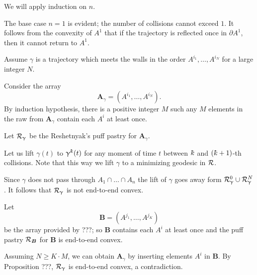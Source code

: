 We will apply induction on $n$.

The base case $n=1$ is evident; the number of collisions cannot exceed $1$.  
It follows from the convexity of $A^1$ that
if the trajectory is reflected once in $\partial A^1$, 
then it cannot return to $A^1$. 

Assume $\gamma$ is a trajectory which meets the walls in the order $A^{i_1},\dots,A^{i_N}$ for a large integer $N$.

Consider the array 
\[\bm{A}_\gamma=(A^{i_1},\dots,A^{i_N}).\]
By induction hypothesis, there is a positive integer $M$ such any $M$ elements in the raw from  $\bm{A}_\gamma$ contain each $A^i$ at least once.

Let $\mathcal{R}_\upgamma$ be  the  Reshetnyak's puff pastry for  $\bm{A}_\gamma$.

Let us lift $\gamma(t)$ to $\gamma^\kay(t)$ 
for any moment of time $t$ between $\kay$ and $(\kay+1)$-th collisions.
Note that this way we lift $\gamma$ to a minimizing geodesic in $\mathcal{R}$.

Since $\gamma$ does not pass through $A_1\cap\dots\cap A_n$
the lift of $\gamma$ goes away form $\spc{R}_\gamma^0\cup \spc{R}_\gamma^N$.
It follows that $\mathcal{R}_\upgamma$ is not end-to-end convex.

Let 
\[\bm{B}=(A^{j_1},\dots,A^{j_K})\] 
be the array provided by ???;
so $\bm{B}$ contains each $A^i$ at least once
and the puff pastry $\mathcal{R}_{\bm{B}}$ for $\bm{B}$ is end-to-end convex.

Assuming $N\ge K\cdot M$,
we can obtain $\bm{A}_\gamma$  
by inserting elements $A^i$ in $\bm{B}$.
By Proposition ???, 
$\mathcal{R}_\upgamma$ is end-to-end convex,
a contradiction.
\qeds
